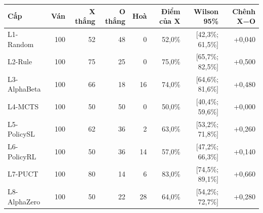 \begin{center}\small
\begin{tabular}{@{}lrrrrrrr@{}}
\toprule
Cấp & Ván & X thắng & O thắng & Hoà & Điểm của X & Wilson 95\% & Chênh X−O \\
\midrule
L1-Random & 100 & 52 & 48 & 0 & 52,0\% & [42,3\%; 61,5\%] & +0,040 \\
L2-Rule & 100 & 75 & 25 & 0 & 75,0\% & [65,7\%; 82,5\%] & +0,500 \\
L3-AlphaBeta & 100 & 66 & 18 & 16 & 74,0\% & [64,6\%; 81,6\%] & +0,480 \\
L4-MCTS & 100 & 50 & 50 & 0 & 50,0\% & [40,4\%; 59,6\%] & +0,000 \\
L5-PolicySL & 100 & 62 & 36 & 2 & 63,0\% & [53,2\%; 71,8\%] & +0,260 \\
L6-PolicyRL & 100 & 50 & 36 & 14 & 57,0\% & [47,2\%; 66,3\%] & +0,140 \\
L7-PUCT & 100 & 80 & 14 & 6 & 83,0\% & [74,5\%; 89,1\%] & +0,660 \\
L8-AlphaZero & 100 & 50 & 22 & 28 & 64,0\% & [54,2\%; 72,7\%] & +0,280 \\
\bottomrule
\end{tabular}
\end{center}